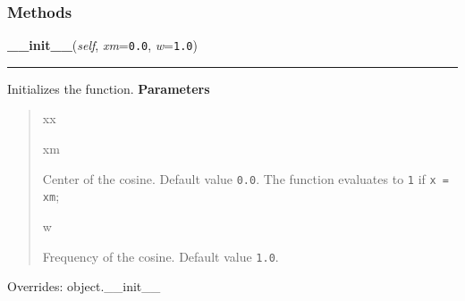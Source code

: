 
  \subsubsection{Methods}

    \vspace{0.5ex}

\hspace{.8\funcindent}\begin{boxedminipage}{\funcwidth}

    \raggedright \textbf{\_\_init\_\_}(\textit{self}, \textit{xm}={\tt 0.0}, \textit{w}={\tt 1.0})

    \vspace{-1.5ex}

    \rule{\textwidth}{0.5\fboxrule}
\setlength{\parskip}{2ex}

Initializes the function.
\setlength{\parskip}{1ex}
      \textbf{Parameters}
      \vspace{-1ex}

      \begin{quote}
        \begin{Ventry}{xx}

          \item[xm]


Center of the cosine. Default value \texttt{0.0}. The function evaluates
to \texttt{1} if \texttt{x = xm};
          \item[w]


Frequency of the cosine. Default value \texttt{1.0}.
        \end{Ventry}

      \end{quote}

      Overrides: object.\_\_init\_\_

    \end{boxedminipage}

    \vspace{0.5ex}

